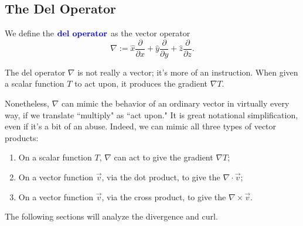 

\subsection{The Del Operator}

\begin{definition}
We define the $\textbf{\color{blue} del operator}$ as the vector operator
\[\nabla:=\hat{x}\frac{\partial}{\partial x}+\hat{y}\frac{\partial}{\partial y}+\hat{z}\frac{\partial}{\partial z}.\]
\end{definition}

The del operator $\nabla$ is not really a vector; it's more of an instruction. When given a scalar function $T$ to act upon, it produces the gradient $\nabla T$.

Nonetheless, $\nabla$ can mimic the behavior of an ordinary vector in virtually every way, if we translate ``multiply" as ``act upon." It is great notational simplification, even if it's a bit of an abuse. Indeed, we can mimic all three types of vector products:

\begin{enumerate}
    \item On a scalar function $T$, $\nabla$ can act to give the gradient $\nabla T$;
    \item On a vector function $\vec{v}$, via the dot product, to give the  $\nabla\cdot \vec{v}$;
    \item On a vector function $\vec{v}$, via the cross product, to give the  $\nabla\times \vec{v}$.
\end{enumerate}
The following sections will analyze the divergence and curl.

